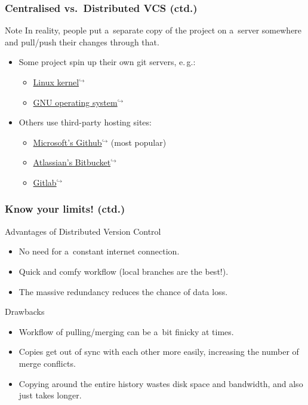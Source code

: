 \documentclass[12pt]{beamer}
\begin{document}
\begin{frame}
  \frametitle{Centralised vs.\ Distributed VCS (ctd.)}

  \begin{block}{Note}
    In reality, people put a~separate copy of the project on a~server somewhere
    and pull/push their changes through that.
    \begin{itemize}
      \item Some project spin up their own git servers, e.\,g.:
        \begin{itemize}
          \item \href{https://git.kernel.org/}{Linux kernel$^{\hookrightarrow}$}
          \item \href{https://savannah.gnu.org/}{GNU operating system$^{\hookrightarrow}$}
        \end{itemize}
      \item Others use third-party hosting sites:
        \begin{itemize}
          \item \href{https://github.com}{Microsoft's Github$^{\hookrightarrow}$}
            (most popular)
          \item \href{https://bitbucket.org}{Atlassian's Bitbucket$^{\hookrightarrow}$}
          \item \href{https://about.gitlab.com}{Gitlab$^{\hookrightarrow}$}
        \end{itemize}
    \end{itemize}
  \end{block}
\end{frame}

\begin{frame}
  \frametitle{Know your limits! (ctd.)}

  \begin{block}{Advantages of Distributed Version Control}
    \begin{itemize}
      \item No need for a~constant internet connection.
      \item Quick and comfy workflow (local branches are the best!).
      \item The massive redundancy reduces the chance of data loss.
    \end{itemize}
  \end{block}

  \begin{block}{Drawbacks}
    \begin{itemize}
      \item Workflow of pulling/merging can be a~bit finicky at times.
      \item Copies get out of sync with each other more easily, increasing the
        number of merge conflicts.
      \item Copying around the entire history wastes disk space and bandwidth,
        and also just takes longer.
    \end{itemize}
  \end{block}
\end{frame}
\end{document}
